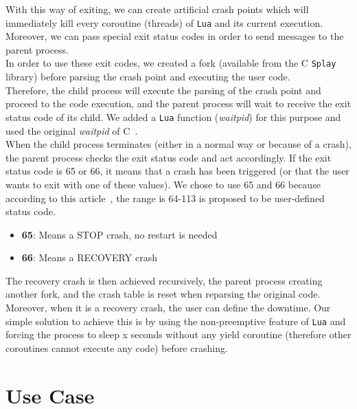 \documentclass{eplmastersthesis}
\begin{document}
        With this way of exiting, we can create artificial crash points which
        will immediately kill every coroutine (threads) of \texttt{Lua} and its
        current execution. Moreover, we can pass special exit status codes
        in order to send messages to the parent process.\\
        In order to use these exit codes, we created a fork (available from
        the C \texttt{Splay} library) before parsing the crash point and executing
        the user code.\\
        Therefore, the child process will execute the parsing of the crash
        point and proceed to the code execution, and the parent process will
        wait to receive the exit status code of its child. We added a \texttt{Lua}
        function (\textit{waitpid}) for this purpose and used the original \textit{waitpid}
        of C~\cite{waitpid}.\\

        When the child process terminates (either in a normal way or because
        of a crash), the parent process checks the exit status code and act
        accordingly. If the exit status code is 65 or 66, it means that a
        crash has been triggered (or that the user wants to exit
        with one of these values). We chose to use 65 and 66 because
        according to this article~\cite{StatusCode}, the range is 64-113
        is proposed to be user-defined status code.

        \begin{itemize}
          \item \textbf{65}: Means a \textsc{STOP} crash, no restart is needed
          \item \textbf{66}: Means a \textsc{RECOVERY} crash
        \end{itemize}

        The recovery crash is then achieved recursively, the parent process
        creating another fork, and the crash table is reset when reparsing
        the original code. Moreover, when it is a recovery crash, the user
        can define the downtime. Our simple solution to achieve this is by
        using the non-preemptive feature of \texttt{Lua} and forcing the process
        to sleep x seconds without any yield coroutine (therefore other
        coroutines cannot execute any code) before crashing.

  \chapter{Use Case}
  \label{chap:usercase}
\end{document}
